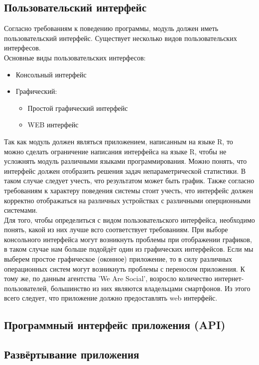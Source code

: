 \documentclass[14pt,a4paper]{scrartcl}
\begin{document}
    \subsection{Пользовательский интерфейс}
    Согласно требованиям к поведению программы, модуль должен иметь пользовательский интерфейс.
    Существует несколько видов пользовательских интерфесов.\\
    Основные виды пользовательских интерфесов:
    \begin{itemize}
        \item Консольный интерфейс
        \item Графический:
        \begin{itemize}
            \item Простой графический интерфейс
            \item WEB интерфейс
        \end{itemize}
    \end{itemize}
    Так как модуль должен являться приложением, написанным на языке R, то можно сделать ограничение написания интерфейса
    на языке R, чтобы не усложнять модуль различными языками программирования.
    Можно понять, что интерфейс должен отобразить решения задач непараметрической статистики.
    В таком случае следует учесть, что результатом может быть график.
    Также согласно требованиям к характеру поведения системы стоит учесть, что интерфейс должен корректно
    отображаться на различных устройствах с различными оперционными системами.\\
    Для того, чтобы определиться с видом пользовательского интерфейса, необходимо понять, какой из них лучше всго соответствует требованиям.
    При выборе консольного интерфейса могут возникнуть проблемы при отображении графиков, в таком случае нам больше подойдёт один из графических интерфейсов.
    Если мы выберем простое графическое (оконное) приложение, то в силу различных операционных систем могут возникнуть проблемы с переносом приложения.
    К тому же, по данным агентства 'We Are Social', возросло количество интернет-пользователей, большинство из них являются владельцами смартфонов\cite{Internet-statistic-2018}.
    Из этого всего следует, что приложение должно предоставлять web интерфейс.

    \subsection[Программный интерфейс приложения]{Программный интерфейс приложения (API)}
    \subsection[Развёртывание приложения]{Развёртывание приложения}
\end{document}
